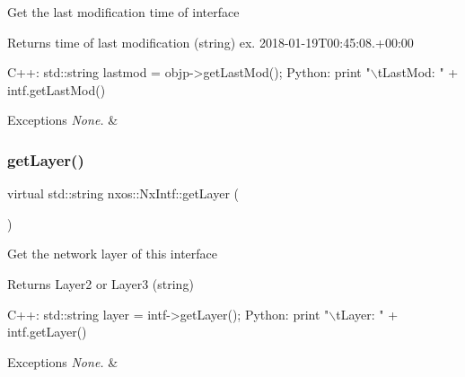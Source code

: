 Get the last modification time of interface

\begin{DoxyReturn}{Returns}
time of last modification (string) ex. 2018-\/01-\/19\+T00\+:45\+:08.+00\+:00
\end{DoxyReturn}

\begin{DoxyCode}
C++:
    std::string  lastmod  =  objp->getLastMod();
Python:
    print \textcolor{stringliteral}{"\(\backslash\)tLastMod: "} + intf.getLastMod()   
\end{DoxyCode}



\begin{DoxyExceptions}{Exceptions}
{\em None.} & \\
\hline
\end{DoxyExceptions}
\mbox{\label{classnxos_1_1_nx_intf_af3a8f5ce6dd05fa582d1f7056a4438ca}} 
\subsubsection{\texorpdfstring{get\+Layer()}{getLayer()}}
{\footnotesize\ttfamily virtual std\+::string nxos\+::\+Nx\+Intf\+::get\+Layer (\begin{DoxyParamCaption}{ }\end{DoxyParamCaption})\hspace{0.3cm}{\ttfamily [pure virtual]}}

Get the network layer of this interface

\begin{DoxyReturn}{Returns}
Layer2 or Layer3 (string)
\end{DoxyReturn}

\begin{DoxyCode}
C++:
         std::string layer = intf->getLayer();
Python:
         print \textcolor{stringliteral}{"\(\backslash\)tLayer: "} + intf.getLayer()
\end{DoxyCode}



\begin{DoxyExceptions}{Exceptions}
{\em None.} & \\
\hline
\end{DoxyExceptions}
\mbox{\label{classnxos_1_1_nx_intf_a21f7c1b00f609f61ac2d8b68abea1f77}} 
